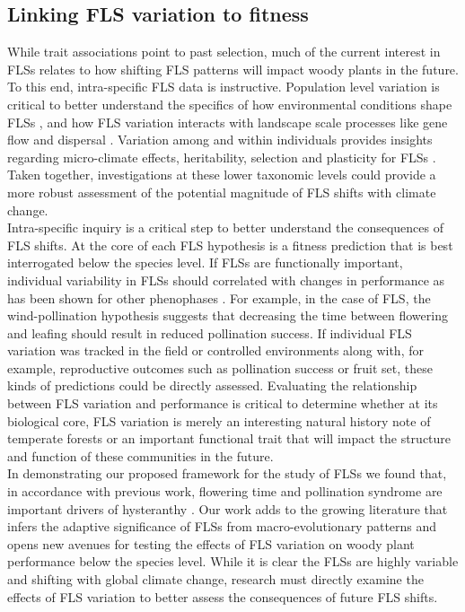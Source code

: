 \documentclass[11pt]{article}
\begin{document}
\subsection*{Linking FLS variation to fitness}
\noindnent While trait associations point to past selection, much of the current interest in FLSs relates to how shifting FLS patterns will impact woody plants in the future. To this end, intra-specific FLS data is instructive.  Population level variation is critical to better understand the specifics of how environmental conditions shape FLSs \citep{Vitasse2009}, and how FLS variation interacts with landscape scale processes like gene flow and dispersal \citep{Manel2003}. Variation among and within individuals provides insights regarding  micro-climate effects, heritability, selection and plasticity for FLSs \citep{Denechere2019}.  Taken together, investigations at these lower taxonomic levels could provide a more robust assessment of the potential magnitude of FLS shifts with climate change.\\

\noindent Intra-specific inquiry is a critical step to better understand the consequences of FLS shifts. At the core of each FLS hypothesis is a fitness prediction that is best interrogated below the species level. If FLSs are functionally important, individual variability in FLSs should correlated with changes in performance as has been shown for other phenophases \citep[e.g.][]{Schermer2020}. For example, in the case of FLS, the wind-pollination hypothesis suggests that decreasing the time between flowering and leafing should result in reduced pollination success. If individual FLS variation  was tracked in the field or controlled environments along with, for example, reproductive outcomes such as pollination success or fruit set, these kinds of predictions could be directly assessed. Evaluating the relationship between FLS variation and performance is critical to determine whether at its biological core, FLS variation is merely an interesting natural history note of temperate forests or an important functional trait that will impact the structure and function of these communities in the future.\\ 

\noindent In demonstrating our proposed framework for the study of FLSs we found that, in accordance with previous work, flowering time and pollination syndrome are important drivers of hysteranthy \citep{Gougherty2018}. Our work adds to the growing literature that infers the adaptive significance of FLSs from macro-evolutionary patterns and opens new avenues for testing the effects of FLS variation on woody plant performance below the species level. While it is clear the FLSs are highly variable and shifting with global climate change, research must directly examine the effects of FLS variation to better assess the consequences of future FLS shifts.\\
\end{document}

